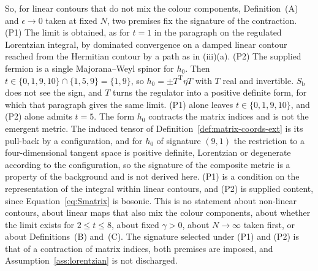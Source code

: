 So, for linear contours that do not mix the colour components, Definition~(A) and \(\epsilon\to0\) taken at fixed \(N\), two premises fix the signature of the contraction. (P1) The limit is obtained, as for \(t=1\) in the paragraph on the regulated Lorentzian integral, by dominated convergence on a damped linear contour reached from the Hermitian contour by a path as in (iii)(a). (P2) The supplied fermion is a single Majorana--Weyl spinor for \(h_0\). Then \(t\in\{0,1,9,10\}\cap\{1,5,9\}=\{1,9\}\), so \(h_0=\pm T^{\mathrm T}\eta T\) with \(T\) real and invertible. \(S_{\mathrm b}\) does not see the sign, and \(T\) turns the regulator into a positive definite form, for which that paragraph gives the same limit. (P1) alone leaves \(t\in\{0,1,9,10\}\), and (P2) alone admits \(t=5\). The form \(h_0\) contracts the matrix indices and is not the emergent metric. The induced tensor of Definition~\ref{def:matrix-coords-ext} is its pull-back by a configuration, and for \(h_0\) of signature \((9,1)\) the restriction to a four-dimensional tangent space is positive definite, Lorentzian or degenerate according to the configuration, so the signature of the composite metric is a property of the background and is not derived here. (P1) is a condition on the representation of the integral within linear contours, and (P2) is supplied content, since Equation~\eqref{eq:Smatrix} is bosonic. This is no statement about non-linear contours, about linear maps that also mix the colour components, about whether the limit exists for \(2\le t\le8\), about fixed \(\gamma>0\), about \(N\to\infty\) taken first, or about Definitions~(B) and~(C). The signature selected under (P1) and (P2) is that of a contraction of matrix indices, both premises are imposed, and Assumption~\ref{ass:lorentzian} is not discharged.
